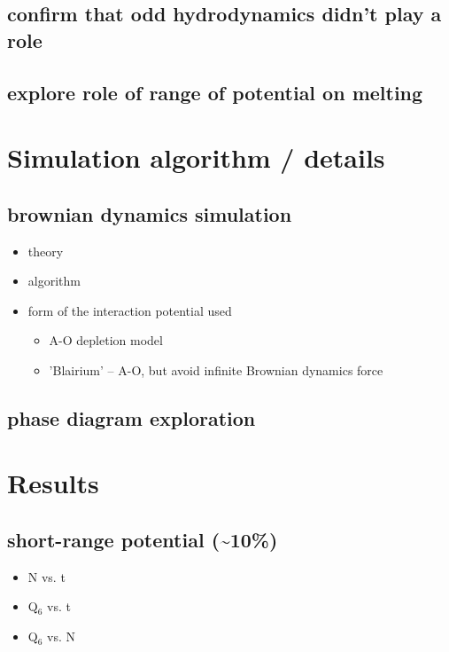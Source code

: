 \documentclass{umthesis}
\begin{document}
\subsection{confirm that odd hydrodynamics didn't play a role}
\label{sec-1.5.1}
\subsection{explore role of range of potential on melting}
\label{sec-1.5.2}
\section{Simulation algorithm / details}
\label{sec-1.6}
\subsection{brownian dynamics simulation}
\label{sec-1.6.1}
\begin{itemize}

\item theory\\
\label{sec-1.6.1.1}%
\item algorithm\\
\label{sec-1.6.1.2}%
\item form of the interaction potential used
\label{sec-1.6.1.3}%
\begin{itemize}

\item A-O depletion model\\
\label{sec-1.6.1.3.1}%
\item 'Blairium' -- A-O, but avoid infinite Brownian dynamics force\\
\label{sec-1.6.1.3.2}%
\end{itemize} %
\end{itemize} %
\subsection{phase diagram exploration}
\label{sec-1.6.2}
\section{Results}
\label{sec-1.7}
\subsection{short-range potential (\~{}10\%)}
\label{sec-1.7.1}
\begin{itemize}

\item N vs. t\\
\label{sec-1.7.1.1}%
\item Q$_6$ vs. t\\
\label{sec-1.7.1.2}%
\item Q$_6$ vs. N\\
\label{sec-1.7.1.3}%
\end{itemize} %
\end{document}
